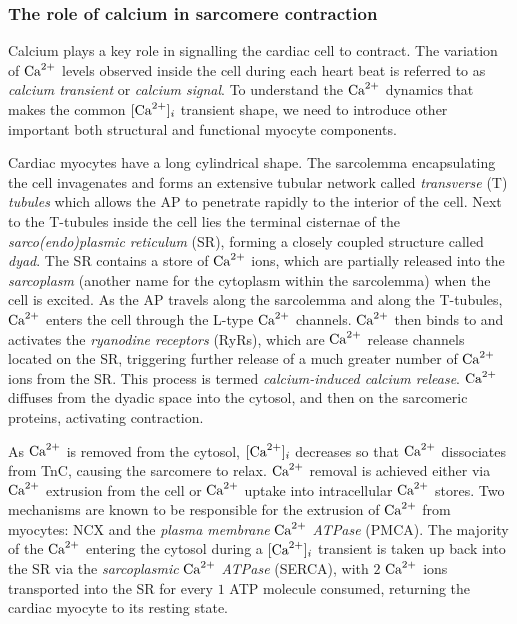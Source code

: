 



%
%
%
\subsubsection{The role of calcium in sarcomere contraction}
Calcium plays a key role in signalling the cardiac cell to contract. The variation of $\textrm{Ca}^{2+}$ levels observed inside the cell during each heart beat is referred to as \textit{calcium transient} or \textit{calcium signal}. To understand the $\textrm{Ca}^{2+}$ dynamics that makes the common $[\textrm{Ca}^{2+}]_{i}$ transient shape, we need to introduce other important both structural and functional myocyte components.

\vspace{0.2cm}
Cardiac myocytes have a long cylindrical shape. The sarcolemma encapsulating the cell invagenates and forms an extensive tubular network called \textit{transverse} (\acs{T}) \textit{tubules} which allows the AP to penetrate rapidly to the interior of the cell. Next to the T-tubules inside the cell lies the terminal cisternae of the \textit{sarco(endo)plasmic reticulum} (\acs{SR}), forming a closely coupled structure called \textit{dyad}. The SR contains a store of $\textrm{Ca}^{2+}$ ions, which are partially released into the \textit{sarcoplasm} (another name for the cytoplasm within the sarcolemma) when the cell is excited. As the AP travels along the sarcolemma and along the T-tubules, $\textrm{Ca}^{2+}$ enters the cell through the L-type $\textrm{Ca}^{2+}$ channels. $\textrm{Ca}^{2+}$ then binds to and activates the \textit{ryanodine receptors} (\acs{RyR}s), which are $\textrm{Ca}^{2+}$ release channels located on the SR, triggering further release of a much greater number of $\textrm{Ca}^{2+}$ ions from the SR. This process is termed \textit{calcium-induced calcium release}. $\textrm{Ca}^{2+}$ diffuses from the dyadic space into the cytosol, and then on the sarcomeric proteins, activating contraction.

\vspace{0.2cm}
As $\textrm{Ca}^{2+}$ is removed from the cytosol, $[\textrm{Ca}^{2+}]_{i}$ decreases so that $\textrm{Ca}^{2+}$ dissociates from TnC, causing the sarcomere to relax. $\textrm{Ca}^{2+}$ removal is achieved either via $\textrm{Ca}^{2+}$ extrusion from the cell or $\textrm{Ca}^{2+}$ uptake into intracellular $\textrm{Ca}^{2+}$ stores. Two mechanisms are known to be responsible for the extrusion of $\textrm{Ca}^{2+}$ from myocytes: NCX and the \textit{plasma membrane} $\textrm{Ca}^{2+}$ \textit{ATPase} (\acs{PMCA}). The majority of the $\textrm{Ca}^{2+}$ entering the cytosol during a $[\textrm{Ca}^{2+}]_{i}$ transient is taken up back into the SR via the \textit{sarcoplasmic} $\textrm{Ca}^{2+}$ \textit{ATPase} (\acs{SERCA}), with $2$ $\textrm{Ca}^{2+}$ ions transported into the SR for every $1$ ATP molecule consumed, returning the cardiac myocyte to its resting state.

